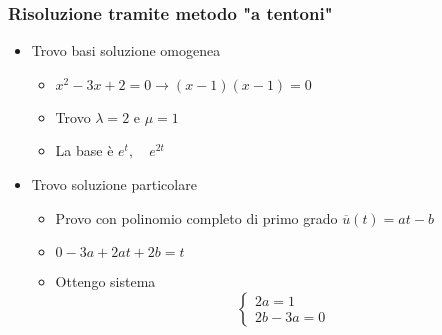 \subsubsection*{Risoluzione tramite metodo "a tentoni"}
\begin{itemize}
	\item Trovo basi soluzione omogenea
	      \begin{itemize}
		      \item $ x^2 - 3x + 2 =0 \rightarrow \left( x-1 \right) \left( x-1 \right) =0 $
		      \item Trovo $ \lambda  = 2 $ e $ \mu  = 1 $
		      \item La base è $ e^{t}, \quad e ^{2t} $
	      \end{itemize}
	\item Trovo soluzione particolare
	      \begin{itemize}
		      \item Provo con polinomio completo di primo grado $ \overline{u}\left( t \right) =at - b $
		      \item $ 0-3a + 2at + 2b = t $
		      \item Ottengo sistema
		            \[
			            \begin{cases}
				            2a=1 \\
				            2b-3a=0
			            \end{cases}
		            \]
	      \end{itemize}
\end{itemize}
